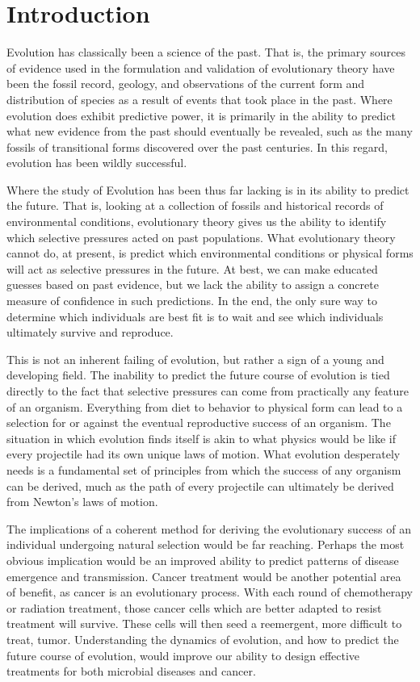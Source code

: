 \chapter{Introduction} %
\label{cha:introduction}
Evolution has classically been a science of the past. That is, the primary sources of evidence used in the formulation and validation of evolutionary theory have been the fossil record, geology, and observations of the current form and distribution of species as a result of events that took place in the past. Where evolution does exhibit predictive power, it is primarily in the ability to predict what new evidence from the past should eventually be revealed, such as the many fossils of transitional forms discovered over the past centuries. In this regard, evolution has been wildly successful.

Where the study of Evolution has been thus far lacking is in its ability to predict the future. That is, looking at a collection of fossils and historical records of environmental conditions, evolutionary theory gives us the ability to identify which selective pressures acted on past populations. What evolutionary theory cannot do, at present, is predict which environmental conditions or physical forms will act as selective pressures in the future. At best, we can make educated guesses based on past evidence, but we lack the ability to assign a concrete measure of confidence in such predictions. In the end, the only sure way to determine which individuals are best fit is to wait and see which individuals ultimately survive and reproduce.

This is not an inherent failing of evolution, but rather a sign of a young and developing field. The inability to predict the future course of evolution is tied directly to the fact that selective pressures can come from practically any feature of an organism. Everything from diet to behavior to physical form can lead to a selection for or against the eventual reproductive success of an organism. The situation in which evolution finds itself is akin to what physics would be like if every projectile had its own unique laws of motion. What evolution desperately needs is a fundamental set of principles from which the success of any organism can be derived, much as the path of every projectile can ultimately be derived from Newton's laws of motion.

The implications of a coherent method for deriving the evolutionary success of an individual undergoing natural selection would be far reaching. Perhaps the most obvious implication would be an improved ability to predict patterns of disease emergence and transmission. Cancer treatment would be another potential area of benefit, as cancer is an evolutionary process. With each round of chemotherapy or radiation treatment, those cancer cells which are better adapted to resist treatment will survive. These cells will then seed a reemergent, more difficult to treat, tumor. Understanding the dynamics of evolution, and how to predict the future course of evolution, would improve our ability to design effective treatments for both microbial diseases and cancer.

